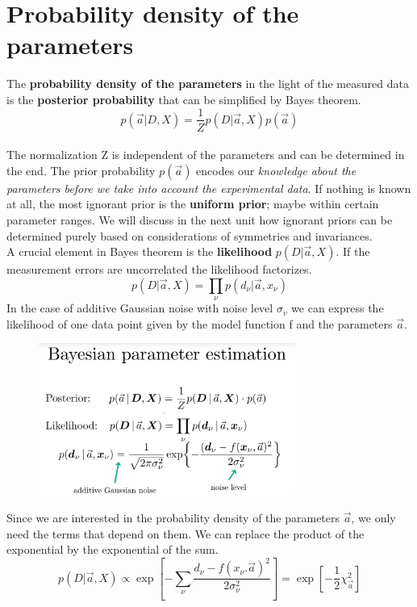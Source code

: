 \documentclass[12pt, a4paper]{scrartcl}
\begin{document}
\section*{Probability density of the parameters}
The \textbf{probability density of the parameters} in the light of the measured data is the \textbf{posterior probability} that can
be simplified by Bayes theorem.
\begin{equation*}\boxed{p(\vec{a}|D,X)=\frac 1Z p(D|\vec{a},X)p(\vec{a})
}\end{equation*}\\
 The normalization Z is independent of the parameters and can be determined in the end.
The prior probability $p(\vec{a})$ encodes our \textit{knowledge about the parameters before we take into account the experimental data}.
If nothing is known at all, the most ignorant prior is the \textbf{uniform prior}; maybe within
certain parameter ranges. We will discuss in the next unit how ignorant
priors can be determined purely based on considerations of symmetries and
invariances.\\
A crucial element in Bayes theorem is the \textbf{likelihood} $p(D|\vec{a},X)$.
If the measurement errors are uncorrelated the likelihood factorizes.
\[ p(D|\vec{a},X)=\prod_{\nu} p(d_{\nu}|\vec{a},x_{\nu})\]
In the case of additive Gaussian noise with noise level $\sigma_v$ we can express the
likelihood of one data point given by the model function f and the parameters $\vec{a}$.%
\begin{figure}[H]
	\centering
	\includegraphics[width=0.75\textwidth]{7_3.png}
\end{figure}
Since we are interested in the probability density of the parameters $\vec{a}$,%
we only need the terms that depend on them. We can replace the product
of the exponential by the exponential of the sum.
\begin{equation*}\boxed{ p(D|\vec{a},X)\propto \exp\left[-\sum_{\nu}\frac{d_{\nu}-f(x_{\nu}.\vec{a})^2}{2\sigma_{\nu}^2}\right]=\exp\left[-\frac 12 \chi_{\vec{a}}^2\right]}\end{equation*}\\
\end{document}
